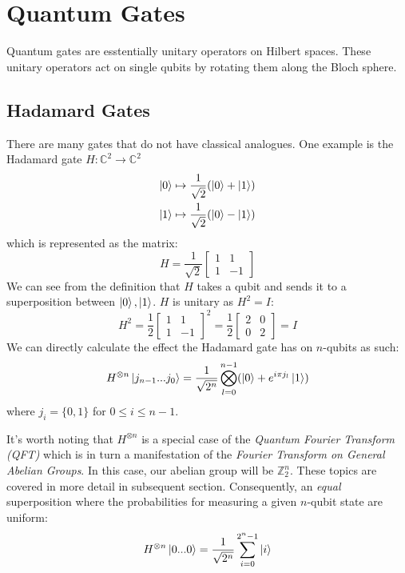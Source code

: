 \documentclass[quantum.tex]{subfiles}
\begin{document}
\section{Quantum Gates}

Quantum gates are esstentially unitary operators on Hilbert spaces. These unitary operators act on single qubits by rotating them along the Bloch sphere.

\subsection{Hadamard Gates}
There are many gates that do not have classical analogues. One example is the Hadamard gate $H: \mathbb{C}^2 \rightarrow \mathbb{C}^2$
\begin{gather*}
  \ket{0} \mapsto \frac{1}{\sqrt{2}}(\ket{0} + \ket{1}) \\
  \ket{1} \mapsto \frac{1}{\sqrt{2}}(\ket{0} - \ket{1})
\end{gather*}
which is represented as the matrix:
$$ H =  \frac{1}{\sqrt{2}} \begin{bmatrix} 1 & 1 \\ 1 & -1 \end{bmatrix} $$
We can see from the definition that $H$ takes a qubit and sends it to a superposition between $\ket{0},\ket{1}$. $H$ is unitary as $H^2 = I$:
$$H^2 = \frac{1}{2} \begin{bmatrix} 1 & 1 \\ 1 & -1 \end{bmatrix}^2 = \frac{1}{2}\begin{bmatrix} 2 & 0 \\ 0 & 2 \end{bmatrix} = I $$
%
We can directly calculate the effect the Hadamard gate has on $n$-qubits as such:
%
$$ H^{\otimes n} \ket{j_{n-1}...j_0} = \frac{1}{\sqrt{2^n}}\bigotimes_{l=0}^{n-1} (\ket{0} + e^{i\pi j_l}\ket{1}) $$
%
where $j_i = \{0,1\}$ for $0 \leq i \leq n-1$.

It's worth noting that $H^{\otimes n}$ is a special case of the \textit{Quantum Fourier Transform (QFT)} which is in turn a manifestation of the \textit{Fourier Transform on General Abelian Groups}. In this case, our abelian group will be $\mathbb{Z}_2^n$. These topics are covered in more detail in subsequent section.
%
Consequently, an \textit{equal} superposition where the probabilities for measuring a given $n$-qubit state are uniform:
$$H^{\otimes n}\ket{0...0} = \frac{1}{\sqrt{2^n}}\sum_{i=0}^{2^n-1}\ket{i}$$
\end{document}
